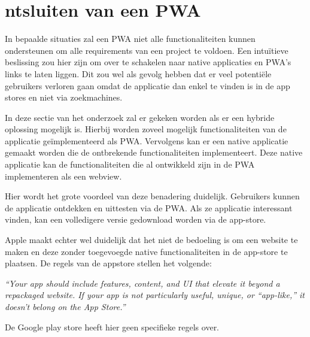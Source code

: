 \section{ntsluiten van een PWA}
In bepaalde situaties zal een PWA niet alle functionaliteiten kunnen ondersteunen om alle requirements van een project te voldoen. Een intuïtieve beslissing zou hier zijn om over te schakelen naar native applicaties en PWA’s links te laten liggen. Dit zou wel als gevolg hebben dat er veel potentiële gebruikers verloren gaan omdat de applicatie dan enkel te vinden is in de app stores en niet via zoekmachines.

In deze sectie van het onderzoek zal er gekeken worden als er een hybride oplossing mogelijk is. Hierbij worden zoveel mogelijk functionaliteiten van de applicatie geïmplementeerd als PWA. Vervolgens kan er een native applicatie gemaakt worden die de ontbrekende functionaliteiten implementeert. Deze native applicatie kan de functionaliteiten die al ontwikkeld zijn in de PWA implementeren als een webview. 

Hier wordt het grote voordeel van deze benadering duidelijk. Gebruikers kunnen de applicatie ontdekken en uittesten via de PWA. Als ze applicatie interessant vinden, kan een volledigere versie gedownload worden via de app-store.

Apple maakt echter wel duidelijk dat het niet de bedoeling is om een website te maken en deze zonder toegevoegde native functionaliteiten in de app-store te plaatsen. De regels van de appstore stellen het volgende:

\textit{“Your app should include features, content, and UI that elevate it beyond a repackaged website. If your app is not particularly useful, unique, or “app-like,” it doesn’t belong on the App Store.”}
\autocite{Apple2020c}


De Google play store heeft hier geen specifieke regels over.
\autocite{GooglePlay2020a}